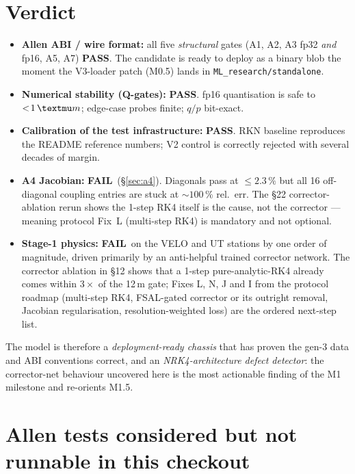 \documentclass[11pt,a4paper]{article}
\newcommand{\qop}{\ensuremath{q/p}}
\newcommand{\PASS}{\textcolor{green!55!black}{\textbf{PASS}}}
\newcommand{\FAIL}{\textcolor{red!70!black}{\textbf{FAIL}}}
\begin{document}
\section{Verdict}

\begin{itemize}[leftmargin=2em,nosep]
\item \textbf{Allen ABI / wire format:} all five \emph{structural}
      gates (A1, A2, A3 fp32 \emph{and} fp16, A5, A7) \PASS. The
      candidate is ready to deploy as a binary blob the moment the
      V3-loader patch (M0.5) lands in \texttt{ML\_research/standalone}.
\item \textbf{Numerical stability (Q-gates):} \PASS. fp16 quantisation
      is safe to \(<\!1\,\textmu m\); edge-case probes finite;
      \(\qop\) bit-exact.
\item \textbf{Calibration of the test infrastructure:} \PASS. RKN
      baseline reproduces the README reference numbers; V2 control is
      correctly rejected with several decades of margin.
\item \textbf{A4 Jacobian:} \FAIL\ (\S\ref{sec:a4}). Diagonals
      pass at \(\le\!2.3\,\%\) but all 16 off-diagonal coupling
      entries are stuck at \(\sim\!100\,\%\) rel.\ err. The §22
      corrector-ablation rerun shows the 1-step RK4 itself is the
      cause, not the corrector --- meaning protocol Fix~L (multi-step
      RK4) is mandatory and not optional.
\item \textbf{Stage-1 physics:} \FAIL\ on the VELO and UT stations by
      one order of magnitude, driven primarily by an anti-helpful
      trained corrector network. The corrector ablation in §12 shows
      that a 1-step pure-analytic-RK4 already comes within
      \(3\times\) of the 12\,\textmu m gate; Fixes L, N, J and I
      from the protocol roadmap (multi-step RK4, FSAL-gated corrector
      or its outright removal, Jacobian regularisation,
      resolution-weighted loss) are the ordered next-step list.
\end{itemize}

The model is therefore a \emph{deployment-ready chassis} that has
proven the gen-3 data and ABI conventions correct, and an
\emph{NRK4-architecture defect detector}: the corrector-net behaviour
uncovered here is the most actionable finding of the M1 milestone and
re-orients M1.5.

\section{Allen tests considered but not runnable in this checkout}
\end{document}
